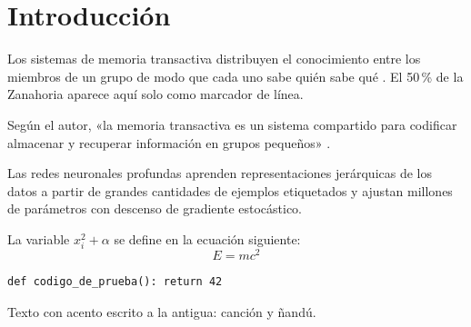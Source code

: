 \chapter{Introducción}
\label{cap:intro}

Los sistemas de memoria transactiva distribuyen el conocimiento entre los miembros de un
grupo de modo que cada uno sabe quién sabe qué \cite{fuente1}. El 50\,\% de la
Zanahoria aparece aquí solo como marcador de línea.

Según el autor, «la memoria transactiva es un sistema compartido para codificar almacenar y
recuperar información en grupos pequeños» \cite[p.~3]{fuente1}.

Las redes neuronales profundas aprenden representaciones jerárquicas de los datos a partir
de grandes cantidades de ejemplos etiquetados y ajustan millones de parámetros con descenso
de gradiente estocástico.

La variable $x_i^2 + \alpha$ se define en la ecuación siguiente:
\begin{equation}
  E = m c^2 \label{eq:energia}
\end{equation}

\begin{verbatim}
def codigo_de_prueba(): return 42
\end{verbatim}

Texto con acento escrito a la antigua: canci\'on y \~nandú.

